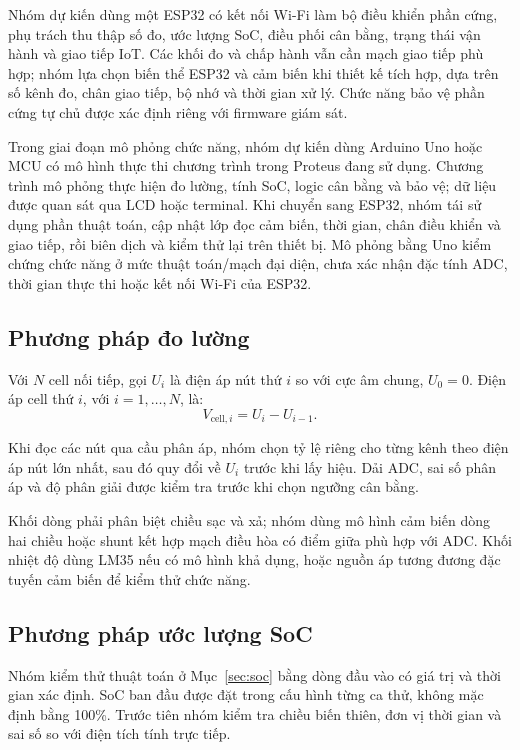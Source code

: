 Nhóm dự kiến dùng một ESP32 có kết nối Wi-Fi làm bộ điều khiển phần cứng, phụ trách thu thập số đo, ước lượng SoC, điều phối cân bằng, trạng thái vận hành và giao tiếp IoT. Các khối đo và chấp hành vẫn cần mạch giao tiếp phù hợp; nhóm lựa chọn biến thể ESP32 và cảm biến khi thiết kế tích hợp, dựa trên số kênh đo, chân giao tiếp, bộ nhớ và thời gian xử lý. Chức năng bảo vệ phần cứng tự chủ được xác định riêng với firmware giám sát.

Trong giai đoạn mô phỏng chức năng, nhóm dự kiến dùng Arduino Uno hoặc MCU có mô hình thực thi chương trình trong Proteus đang sử dụng. Chương trình mô phỏng thực hiện đo lường, tính SoC, logic cân bằng và bảo vệ; dữ liệu được quan sát qua LCD hoặc terminal. Khi chuyển sang ESP32, nhóm tái sử dụng phần thuật toán, cập nhật lớp đọc cảm biến, thời gian, chân điều khiển và giao tiếp, rồi biên dịch và kiểm thử lại trên thiết bị. Mô phỏng bằng Uno kiểm chứng chức năng ở mức thuật toán/mạch đại diện, chưa xác nhận đặc tính ADC, thời gian thực thi hoặc kết nối Wi-Fi của ESP32.

\subsection{Phương pháp đo lường}

Với \(N\) cell nối tiếp, gọi \(U_i\) là điện áp nút thứ \(i\) so với cực âm chung, \(U_0=0\). Điện áp cell thứ \(i\), với \(i=1,\ldots,N\), là:
\[
V_{\mathrm{cell},i}=U_i-U_{i-1}.
\]

Khi đọc các nút qua cầu phân áp, nhóm chọn tỷ lệ riêng cho từng kênh theo điện áp nút lớn nhất, sau đó quy đổi về \(U_i\) trước khi lấy hiệu. Dải ADC, sai số phân áp và độ phân giải được kiểm tra trước khi chọn ngưỡng cân bằng.

Khối dòng phải phân biệt chiều sạc và xả; nhóm dùng mô hình cảm biến dòng hai chiều hoặc shunt kết hợp mạch điều hòa có điểm giữa phù hợp với ADC. Khối nhiệt độ dùng LM35 nếu có mô hình khả dụng, hoặc nguồn áp tương đương đặc tuyến cảm biến để kiểm thử chức năng.

\subsection{Phương pháp ước lượng SoC}

Nhóm kiểm thử thuật toán ở Mục~\ref{sec:soc} bằng dòng đầu vào có giá trị và thời gian xác định. SoC ban đầu được đặt trong cấu hình từng ca thử, không mặc định bằng 100\%. Trước tiên nhóm kiểm tra chiều biến thiên, đơn vị thời gian và sai số so với điện tích tính trực tiếp.

